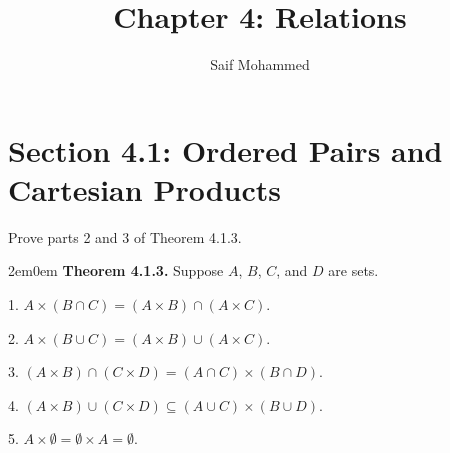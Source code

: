 \documentclass[12pt]{article}
\newenvironment{exercise}[2][Exercise]{\begin{trivlist}
\item[\hskip \labelsep {\bfseries #1}\hskip \labelsep {\bfseries #2.}]}{\end{trivlist}}
\newenvironment{aw}
  {\begin{adjustwidth}{2em}{0em}}
  {\end{adjustwidth}}
\begin{document}
%
%

\title{Chapter 4: Relations} %
\author{Saif Mohammed} %
\maketitle

\section{Section 4.1: Ordered Pairs and Cartesian Products}

\begin{exercise}{5}
	Prove parts 2 and 3 of Theorem 4.1.3.
	\begin{aw}
		\textbf{Theorem 4.1.3.} Suppose $A$, $B$, $C$, and $D$ are sets.

		1. $A \times (B \cap C) = (A \times B) \cap (A \times C)$.

		2. $A \times (B \cup C) = (A \times B) \cup (A \times C)$.

		3. $(A \times B) \cap (C \times D) = (A \cap C) \times (B \cap D)$.

		4. $(A \times B) \cup (C \times D) \subseteq (A \cup C) \times (B \cup D)$.

		5. $A \times \emptyset = \emptyset \times A = \emptyset$.
	\end{aw}
\end{exercise}
\end{document}

